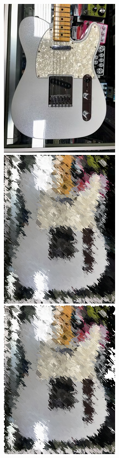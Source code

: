 \begin{figure}
    \centering
    \includegraphics[width=0.4\linewidth]{guitar.jpg}
    \includegraphics[width=0.4\linewidth]{big_guitar.png}
    \includegraphics[width=0.4\linewidth]{guitar.png}
    \label{fig:guitarpics}
\end{figure}
